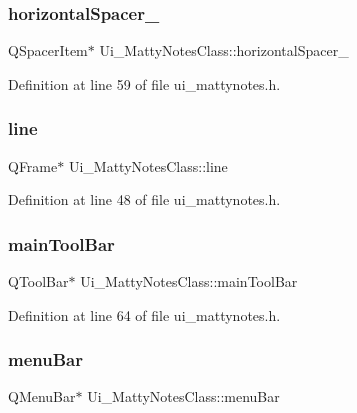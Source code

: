 \subsubsection{\texorpdfstring{horizontal\+Spacer\+\_}{horizontalSpacer\_8}}
{\footnotesize\ttfamily Q\+Spacer\+Item$\ast$ Ui\+\_\+\+Matty\+Notes\+Class\+::horizontal\+Spacer\+\_}



Definition at line 59 of file ui\+\_\+mattynotes.\+h.

\hypertarget{classUi__MattyNotesClass_acd1c3f25052cc5661975bbfb7b183b35}{}\label{classUi__MattyNotesClass_acd1c3f25052cc5661975bbfb7b183b35} 
\subsubsection{\texorpdfstring{line}{line}}
{\footnotesize\ttfamily Q\+Frame$\ast$ Ui\+\_\+\+Matty\+Notes\+Class\+::line}



Definition at line 48 of file ui\+\_\+mattynotes.\+h.

\hypertarget{classUi__MattyNotesClass_a4ff9c72ed35ac4d0873ea7398281e0fe}{}\label{classUi__MattyNotesClass_a4ff9c72ed35ac4d0873ea7398281e0fe} 
\subsubsection{\texorpdfstring{main\+Tool\+Bar}{mainToolBar}}
{\footnotesize\ttfamily Q\+Tool\+Bar$\ast$ Ui\+\_\+\+Matty\+Notes\+Class\+::main\+Tool\+Bar}



Definition at line 64 of file ui\+\_\+mattynotes.\+h.

\hypertarget{classUi__MattyNotesClass_ac32889547eae8466a915c6aac099df4a}{}\label{classUi__MattyNotesClass_ac32889547eae8466a915c6aac099df4a} 
\subsubsection{\texorpdfstring{menu\+Bar}{menuBar}}
{\footnotesize\ttfamily Q\+Menu\+Bar$\ast$ Ui\+\_\+\+Matty\+Notes\+Class\+::menu\+Bar}



